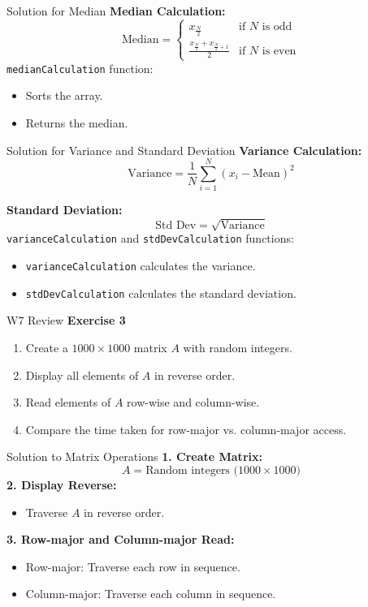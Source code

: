 \documentclass[
	11pt, %
]{beamer}
\begin{document}
\begin{frame}{Solution for Median}
    \textbf{Median Calculation:}
    \[
    \text{Median} = 
    \begin{cases} 
      x_{\frac{N}{2}} & \text{if } N \text{ is odd} \\
      \frac{x_{\frac{N}{2}} + x_{\frac{N}{2}+1}}{2} & \text{if } N \text{ is even}
    \end{cases}
    \]
    \texttt{medianCalculation} function:
    \begin{itemize}
        \item Sorts the array.
        \item Returns the median.
    \end{itemize}
\end{frame}

\begin{frame}{Solution for Variance and Standard Deviation}
    \textbf{Variance Calculation:}
    \[
    \text{Variance} = \frac{1}{N} \sum_{i=1}^N (x_i - \text{Mean})^2
    \]
    
    \textbf{Standard Deviation:}
    \[
    \text{Std Dev} = \sqrt{\text{Variance}}
    \]
    \texttt{varianceCalculation} and \texttt{stdDevCalculation} functions:
    \begin{itemize}
        \item \texttt{varianceCalculation} calculates the variance.
        \item \texttt{stdDevCalculation} calculates the standard deviation.
    \end{itemize}
\end{frame}

\begin{frame}{W7 Review}
    \textbf{Exercise 3}
    \begin{enumerate}
        \item Create a \(1000 \times 1000\) matrix \( A \) with random integers.
        \item Display all elements of \( A \) in reverse order.
        \item Read elements of \( A \) row-wise and column-wise.
        \item Compare the time taken for row-major vs. column-major access.
    \end{enumerate}
\end{frame}

\begin{frame}{Solution to Matrix Operations}
    \textbf{1. Create Matrix:}
    \[
    A = \text{Random integers (1000} \times \text{1000)}
    \]
    \textbf{2. Display Reverse:}
    \begin{itemize}
        \item Traverse \( A \) in reverse order.
    \end{itemize}
    
    \textbf{3. Row-major and Column-major Read:}
    \begin{itemize}
        \item Row-major: Traverse each row in sequence.
        \item Column-major: Traverse each column in sequence.
    \end{itemize}
\end{frame}
\end{document}
